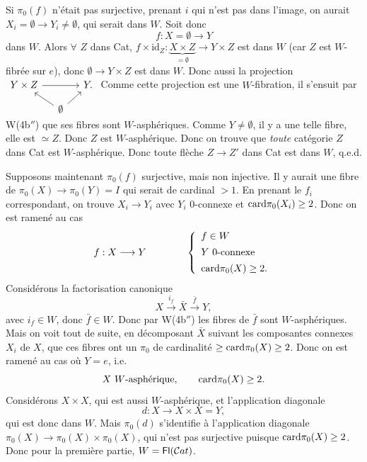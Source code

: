 Si $\pi_0(f)$ n'était pas surjective, prenant $i$ qui n'est pas dans l'image, on aurait $X_i = \emptyset \longrightarrow Y_i \neq \emptyset$, qui serait dans $W$. Soit donc
\[
f : X = \emptyset \longrightarrow Y
\]
dans $W$. Alors $\forall$ $Z$ dans Cat, $f \times \mathrm{id}_Z : \underbrace{X \times Z}_{= \emptyset} \longrightarrow Y \times Z$ est dans $W$ (car $Z$ est
$W$-fibrée sur $e$), donc $\emptyset \longrightarrow Y \times Z$ est dans $W$. Donc aussi la projection
$\begin{tikzcd}[column sep=small, row sep=small, baseline=(\tikzcdmatrixname-1-1.base)]
Y \times Z \arrow[rr] & & Y. \\
& \emptyset \arrow[ul] \arrow[ur] &
\end{tikzcd}$
Comme cette projection est une $W$-fibration, il s'ensuit par W(4b$''$) que ses fibres sont $W$-asphériques. Comme $Y \neq \emptyset$, il y a une telle fibre, elle est $\simeq Z$. Donc $Z$ est $W$-asphérique. Donc on trouve que \textit{toute} catégorie $Z$ dans Cat est $W$-asphérique. Donc toute flèche $Z \longrightarrow Z'$ dans Cat est dans $W$, q.e.d.

Supposons maintenant $\pi_0(f)$ surjective, mais non injective. Il y aurait une fibre de $\pi_0(X) \longrightarrow \pi_0(Y) = I$ qui serait de cardinal $> 1$. En prenant le $f_i$ correspondant, on trouve $X_i \longrightarrow Y_i$ avec $Y_i$ 0-connexe et $\mathrm{card} \pi_0(X_i) \geq 2$. Donc on est ramené au cas
\[
f : X \longrightarrow Y \qquad\qquad \left\{
\begin{array}{l}
f \in W \\[1ex]
Y \text{ 0-connexe} \\[1ex]
\mathrm{card} \pi_0(X) \geq 2.
\end{array}
\right.
\]
Considérons la factorisation canonique
\[
X \xrightarrow{i_f} \bar{X} \xrightarrow{\bar{f}} Y,
\]
avec $i_f \in W$, donc $\bar{f} \in W$. Donc par W(4b$''$) les fibres de $\bar{f}$ sont $W$-asphériques. Mais on voit tout de suite, en décomposant $\bar{X}$ suivant les composantes connexes $X_i$ de $X$, que ces fibres ont un $\pi_0$ de cardinalité $\geq \mathrm{card} \pi_0(X) \geq 2$. Donc on est ramené au cas où $Y = e$, i.e.
\[
X \ W\text{-asphérique}, \qquad \mathrm{card} \pi_0(X) \geq 2.
\]
Considérons $X \times X$, qui est aussi $W$-asphérique, et l'application diagonale
\[
d : X \longrightarrow X \times X = Y,
\]
qui est donc dans $W$. Mais $\pi_0(d)$ s'identifie à l'application diagonale $\pi_0(X) \longrightarrow \pi_0(X) \times \pi_0(X)$, qui n'est pas surjective puisque $\mathrm{card} \pi_0(X) \geq 2$. Donc pour la première partie, $W = \mathsf{Fl}(\mathcal{C}at)$.

